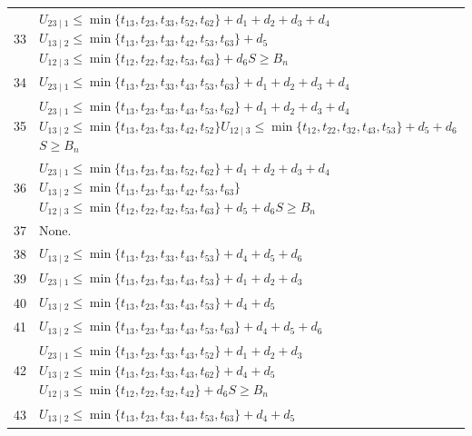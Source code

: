 \documentclass[a4paper,11pt]{amsart}
\numberwithin{equation}{section}
\theoremstyle{definition}
\theoremstyle{remark}
\begin{document}
{\begin{longtable}{@{}r>{\raggedright\arraybackslash}p{12.9cm}@{}}
33 & \(U_{23\mid 1}\leq \min\{t_{13},t_{23},t_{33},t_{52},t_{62}\}+d_{1}+d_{2}+d_{3}+d_{4}\)\newline \(U_{13\mid 2}\leq \min\{t_{13},t_{23},t_{33},t_{42},t_{53},t_{63}\}+d_{5}\)\newline \(U_{12\mid 3}\leq \min\{t_{12},t_{22},t_{32},t_{53},t_{63}\}+d_{6}\)\newline \(S\geq B_n\)\\[3pt]
34 & \(U_{23\mid 1}\leq \min\{t_{13},t_{23},t_{33},t_{43},t_{53},t_{63}\}+d_{1}+d_{2}+d_{3}+d_{4}\)\\[3pt]
35 & \(U_{23\mid 1}\leq \min\{t_{13},t_{23},t_{33},t_{43},t_{53},t_{62}\}+d_{1}+d_{2}+d_{3}+d_{4}\)\newline \(U_{13\mid 2}\leq \min\{t_{13},t_{23},t_{33},t_{42},t_{52}\}\)\newline \(U_{12\mid 3}\leq \min\{t_{12},t_{22},t_{32},t_{43},t_{53}\}+d_{5}+d_{6}\)\newline \(S\geq B_n\)\\[3pt]
36 & \(U_{23\mid 1}\leq \min\{t_{13},t_{23},t_{33},t_{52},t_{62}\}+d_{1}+d_{2}+d_{3}+d_{4}\)\newline \(U_{13\mid 2}\leq \min\{t_{13},t_{23},t_{33},t_{42},t_{53},t_{63}\}\)\newline \(U_{12\mid 3}\leq \min\{t_{12},t_{22},t_{32},t_{53},t_{63}\}+d_{5}+d_{6}\)\newline \(S\geq B_n\)\\[3pt]
37 & None.\\[3pt]
38 & \(U_{13\mid 2}\leq \min\{t_{13},t_{23},t_{33},t_{43},t_{53}\}+d_{4}+d_{5}+d_{6}\)\\[3pt]
39 & \(U_{23\mid 1}\leq \min\{t_{13},t_{23},t_{33},t_{43},t_{53}\}+d_{1}+d_{2}+d_{3}\)\\[3pt]
40 & \(U_{13\mid 2}\leq \min\{t_{13},t_{23},t_{33},t_{43},t_{53}\}+d_{4}+d_{5}\)\\[3pt]
41 & \(U_{13\mid 2}\leq \min\{t_{13},t_{23},t_{33},t_{43},t_{53},t_{63}\}+d_{4}+d_{5}+d_{6}\)\\[3pt]
42 & \(U_{23\mid 1}\leq \min\{t_{13},t_{23},t_{33},t_{43},t_{52}\}+d_{1}+d_{2}+d_{3}\)\newline \(U_{13\mid 2}\leq \min\{t_{13},t_{23},t_{33},t_{43},t_{62}\}+d_{4}+d_{5}\)\newline \(U_{12\mid 3}\leq \min\{t_{12},t_{22},t_{32},t_{42}\}+d_{6}\)\newline \(S\geq B_n\)\\[3pt]
43 & \(U_{13\mid 2}\leq \min\{t_{13},t_{23},t_{33},t_{43},t_{53},t_{63}\}+d_{4}+d_{5}\)\\[3pt]

\end{longtable}}
\end{document}
